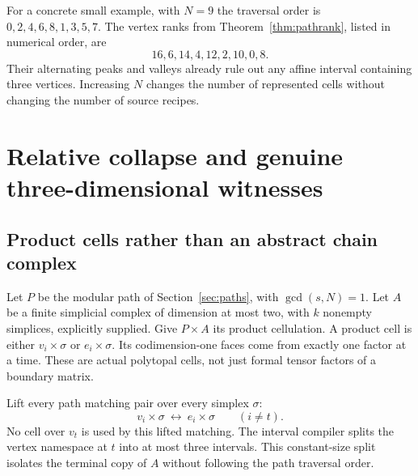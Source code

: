 \documentclass[11pt,letterpaper]{article}
\theoremstyle{definition}
\theoremstyle{remark}\newtheorem{remark}[theorem]{Remark}
\begin{document}
For a concrete small example, with $N=9$ the traversal order is
$0,2,4,6,8,1,3,5,7$. The vertex ranks from Theorem~\ref{thm:pathrank}, listed in numerical order, are
\[
                       16,6,14,4,12,2,10,0,8.
\]
Their alternating peaks and valleys already rule out any affine interval containing three vertices. Increasing $N$ changes the number of represented cells without changing the number of source recipes.

\section{Relative collapse and genuine three-dimensional witnesses}
\label{sec:products}

\subsection{Product cells rather than an abstract chain complex}

Let $P$ be the modular path of Section~\ref{sec:paths}, with $\gcd(s,N)=1$. Let $A$ be a finite simplicial complex of dimension at most two, with $k$ nonempty simplices, explicitly supplied. Give $P\times A$ its product cellulation. A product cell is either $v_i\times\sigma$ or $e_i\times\sigma$. Its codimension-one faces come from exactly one factor at a time. These are actual polytopal cells, not just formal tensor factors of a boundary matrix.

Lift every path matching pair over every simplex $\sigma$:
\[
                    v_i\times\sigma\ \longleftrightarrow\ e_i\times\sigma
                         \qquad(i\ne t).
\]
No cell over $v_t$ is used by this lifted matching. The interval compiler splits the vertex namespace at $t$ into at most three intervals. This constant-size split isolates the terminal copy of $A$ without following the path traversal order.
\end{document}
